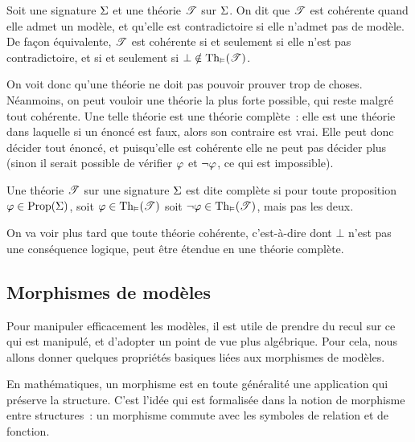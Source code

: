 \begin{definition}
  Soit une signature $\Sigma$ et une théorie $\mathscr T$ sur $\Sigma$. On dit
  que $\mathscr T$ est cohérente quand elle admet un modèle, et qu'elle est
  contradictoire si elle n'admet pas de modèle. De façon équivalente,
  $\mathscr T$ est cohérente si et seulement si elle n'est pas contradictoire,
  et si et seulement si $\bot\notin\operatorname{Th}_{\vDash}(\mathscr T)$.
\end{definition}

On voit donc qu'une théorie ne doit pas pouvoir prouver trop de choses.
Néanmoins, on peut vouloir une théorie la plus forte possible, qui reste malgré
tout cohérente. Une telle théorie est une théorie complète~: elle est une
théorie dans laquelle si un énoncé est faux, alors son contraire est vrai. Elle
peut donc décider tout énoncé, et puisqu'elle est cohérente elle ne peut pas
décider plus (sinon il serait possible de vérifier $\varphi$ et $\lnot \varphi$,
ce qui est impossible).

\begin{definition}
  Une théorie $\mathscr T$ sur une signature $\Sigma$ est dite complète si pour
  toute proposition
  $\varphi\in\operatorname{Prop}(\Sigma)$, soit $\varphi\in \operatorname{Th}_{\vDash}(\mathscr T)$ soit
  $\lnot \varphi \in \operatorname{Th}_{\vDash}(\mathscr T)$, mais pas les deux.
\end{definition}

On va voir plus tard que toute théorie cohérente, c'est-à-dire dont $\bot$ n'est
pas une conséquence logique, peut être étendue en une théorie complète.

\subsection{Morphismes de modèles}

Pour manipuler efficacement les modèles, il est utile de prendre du recul sur ce
qui est manipulé, et d'adopter un point de vue plus algébrique. Pour cela, nous
allons donner quelques propriétés basiques liées aux morphismes de modèles.

En mathématiques, un morphisme est en toute généralité une application qui
préserve la structure. C'est l'idée qui est formalisée dans la notion de
morphisme entre structures~: un morphisme commute avec les symboles de relation
et de fonction.

